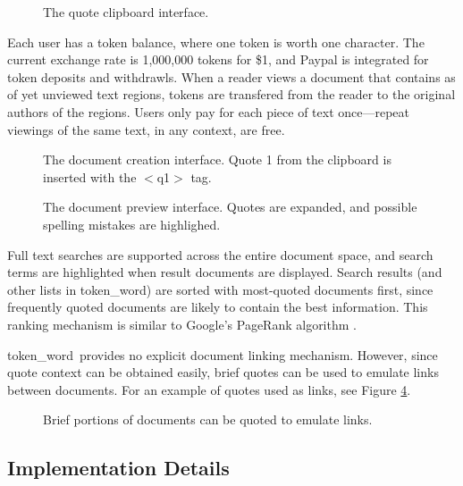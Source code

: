 \documentclass{acm_proc_article-sp}
\newcommand{\tw}{token\_word}
\begin{document}
\begin{figure}[t]
\centering
{}
\caption{The quote clipboard interface.}
\label{fig:quoteClipboard}
\end{figure}


Each user has a token balance, where one token is worth one character.
The current exchange rate is 1,000,000 tokens for \$1, and Paypal is integrated for token deposits and withdrawls.
When a reader views a document that contains as of yet unviewed text regions, tokens are transfered from the reader to the original authors of the regions.
Users only pay for each piece of text once---repeat viewings of the same text, in any context, are free.
\begin{figure}[t]
\centering
{}
\caption{The document creation interface. Quote 1 from the clipboard is inserted with the $<$q1$>$ tag.}
\label{fig:docCreate}
\end{figure}

\begin{figure}[t]
\centering
{}
\caption{The document preview interface.  Quotes are expanded, and possible spelling mistakes are highlighed.}
\label{fig:docPreview}
\end{figure}

Full text searches are supported across the entire document space, and search terms are highlighted when result documents are displayed.
Search results (and other lists in \tw) are sorted with most-quoted documents first, since frequently quoted documents are likely to contain the best information.
This ranking mechanism is similar to Google's PageRank algorithm \cite{Brin1998}. 

\tw \  provides no explicit document linking mechanism.
However, since quote context can be obtained easily, brief quotes can be used to emulate links between documents.
For an example of quotes used as links, see Figure \ref{fig:quotesAsLinks}.

\begin{figure}[t]
\centering
{}
\caption{Brief portions of documents can be quoted to emulate links.}
\label{fig:quotesAsLinks}
\end{figure}

\subsection{Implementation Details}
\end{document}
